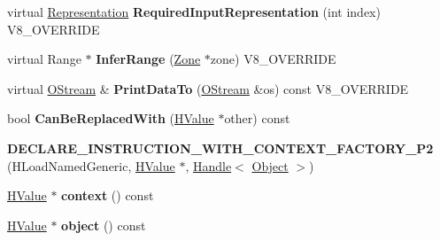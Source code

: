 \begin{DoxyCompactItemize}
\item 
\hypertarget{classv8_1_1internal_1_1_v8___f_i_n_a_l_a6c6d1f37f40b113d8f4062f1ffff7215}{}virtual \hyperlink{classv8_1_1internal_1_1_representation}{Representation} {\bfseries Required\+Input\+Representation} (int index) V8\+\_\+\+O\+V\+E\+R\+R\+I\+D\+E\label{classv8_1_1internal_1_1_v8___f_i_n_a_l_a6c6d1f37f40b113d8f4062f1ffff7215}

\item 
\hypertarget{classv8_1_1internal_1_1_v8___f_i_n_a_l_a7d7c752019e44fc1ba3895619da6a7f5}{}virtual Range $\ast$ {\bfseries Infer\+Range} (\hyperlink{classv8_1_1internal_1_1_zone}{Zone} $\ast$zone) V8\+\_\+\+O\+V\+E\+R\+R\+I\+D\+E\label{classv8_1_1internal_1_1_v8___f_i_n_a_l_a7d7c752019e44fc1ba3895619da6a7f5}

\item 
\hypertarget{classv8_1_1internal_1_1_v8___f_i_n_a_l_ac450dad970b14246be761ccf5004924b}{}virtual \hyperlink{classv8_1_1internal_1_1_o_stream}{O\+Stream} \& {\bfseries Print\+Data\+To} (\hyperlink{classv8_1_1internal_1_1_o_stream}{O\+Stream} \&os) const V8\+\_\+\+O\+V\+E\+R\+R\+I\+D\+E\label{classv8_1_1internal_1_1_v8___f_i_n_a_l_ac450dad970b14246be761ccf5004924b}

\item 
\hypertarget{classv8_1_1internal_1_1_v8___f_i_n_a_l_a86312edfb4d8b6a133873b3f7b87435e}{}bool {\bfseries Can\+Be\+Replaced\+With} (\hyperlink{classv8_1_1internal_1_1_h_value}{H\+Value} $\ast$other) const \label{classv8_1_1internal_1_1_v8___f_i_n_a_l_a86312edfb4d8b6a133873b3f7b87435e}

\item 
\hypertarget{classv8_1_1internal_1_1_v8___f_i_n_a_l_aacef3df6f32c63293cd33192db919990}{}{\bfseries D\+E\+C\+L\+A\+R\+E\+\_\+\+I\+N\+S\+T\+R\+U\+C\+T\+I\+O\+N\+\_\+\+W\+I\+T\+H\+\_\+\+C\+O\+N\+T\+E\+X\+T\+\_\+\+F\+A\+C\+T\+O\+R\+Y\+\_\+\+P2} (H\+Load\+Named\+Generic, \hyperlink{classv8_1_1internal_1_1_h_value}{H\+Value} $\ast$, \hyperlink{classv8_1_1internal_1_1_handle}{Handle}$<$ \hyperlink{classv8_1_1internal_1_1_object}{Object} $>$)\label{classv8_1_1internal_1_1_v8___f_i_n_a_l_aacef3df6f32c63293cd33192db919990}

\item 
\hypertarget{classv8_1_1internal_1_1_v8___f_i_n_a_l_a8294bece2df148267ec52228e2139030}{}\hyperlink{classv8_1_1internal_1_1_h_value}{H\+Value} $\ast$ {\bfseries context} () const \label{classv8_1_1internal_1_1_v8___f_i_n_a_l_a8294bece2df148267ec52228e2139030}

\item 
\hypertarget{classv8_1_1internal_1_1_v8___f_i_n_a_l_a5cf72ed4b954f3413a0aa63069a75283}{}\hyperlink{classv8_1_1internal_1_1_h_value}{H\+Value} $\ast$ {\bfseries object} () const \label{classv8_1_1internal_1_1_v8___f_i_n_a_l_a5cf72ed4b954f3413a0aa63069a75283}


\end{DoxyCompactItemize}
